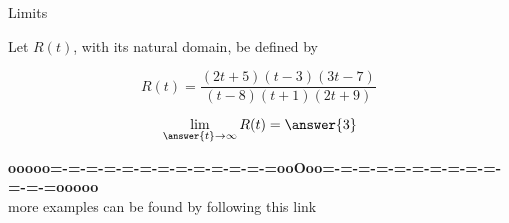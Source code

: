 \documentclass{ximera}
\begin{document}
\begin{example} Limits 



Let $R(t)$, with its natural domain, be defined by 



\[
  R(t) = \frac{(2t+5)(t-3)(3t-7)}{(t-8)(t+1)(2t+9)} \,
\]





\[   \lim_{\answer{t} \to \infty} R(t)   = \answer{3}     \]






\end{example}













\begin{center}
\textbf{\textcolor{green!50!black}{ooooo=-=-=-=-=-=-=-=-=-=-=-=-=ooOoo=-=-=-=-=-=-=-=-=-=-=-=-=ooooo}} \\

more examples can be found by following this link\\ 

\end{center}
\end{document}
